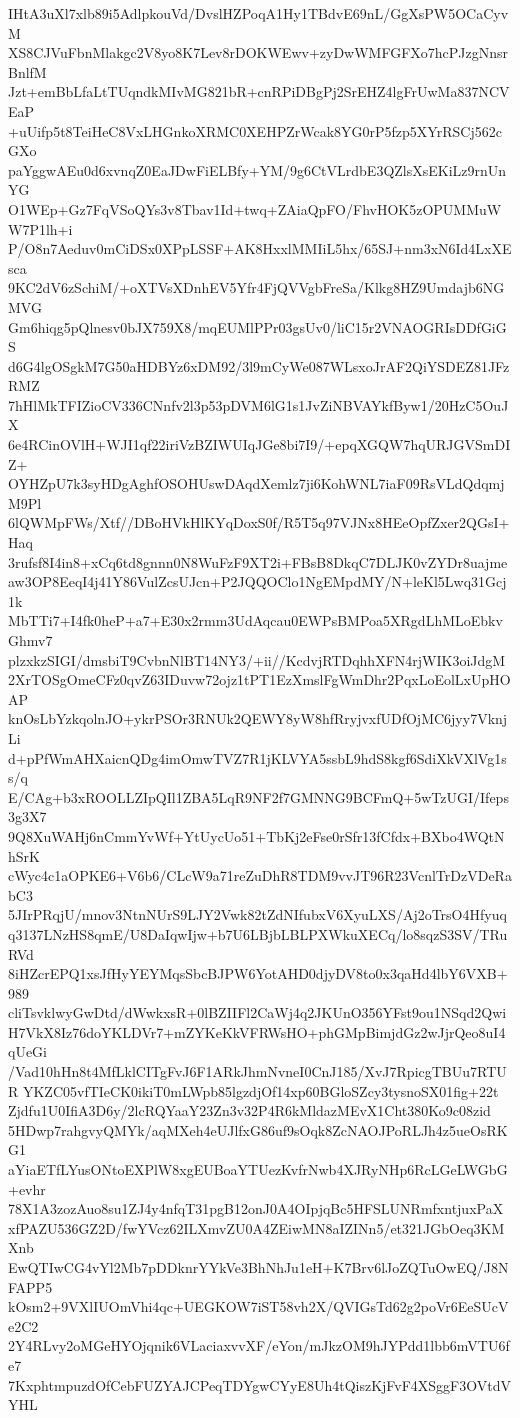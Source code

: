 IHtA3uXl7xlb89i5AdlpkouVd/DvslHZPoqA1Hy1TBdvE69nL/GgXsPW5OCaCyvM
XS8CJVuFbnMlakgc2V8yo8K7Lev8rDOKWEwv+zyDwWMFGFXo7hcPJzgNnsrBnlfM
Jzt+emBbLfaLtTUqndkMIvMG821bR+cnRPiDBgPj2SrEHZ4lgFrUwMa837NCVEaP
+uUifp5t8TeiHeC8VxLHGnkoXRMC0XEHPZrWcak8YG0rP5fzp5XYrRSCj562cGXo
paYggwAEu0d6xvnqZ0EaJDwFiELBfy+YM/9g6CtVLrdbE3QZlsXsEKiLz9rnUnYG
O1WEp+Gz7FqVSoQYs3v8Tbav1Id+twq+ZAiaQpFO/FhvHOK5zOPUMMuWW7P1lh+i
P/O8n7Aeduv0mCiDSx0XPpLSSF+AK8HxxlMMIiL5hx/65SJ+nm3xN6Id4LxXEsca
9KC2dV6zSchiM/+oXTVsXDnhEV5Yfr4FjQVVgbFreSa/Klkg8HZ9Umdajb6NGMVG
Gm6hiqg5pQlnesv0bJX759X8/mqEUMlPPr03gsUv0/liC15r2VNAOGRIsDDfGiGS
d6G4lgOSgkM7G50aHDBYz6xDM92/3l9mCyWe087WLsxoJrAF2QiYSDEZ81JFzRMZ
7hHlMkTFIZioCV336CNnfv2l3p53pDVM6lG1s1JvZiNBVAYkfByw1/20HzC5OuJX
6e4RCinOVlH+WJI1qf22iriVzBZIWUIqJGe8bi7I9/+epqXGQW7hqURJGVSmDIZ+
OYHZpU7k3syHDgAghfOSOHUswDAqdXemlz7ji6KohWNL7iaF09RsVLdQdqmjM9Pl
6lQWMpFWs/Xtf//DBoHVkHlKYqDoxS0f/R5T5q97VJNx8HEeOpfZxer2QGsI+Haq
3rufsf8I4in8+xCq6td8gnnn0N8WuFzF9XT2i+FBsB8DkqC7DLJK0vZYDr8uajme
aw3OP8EeqI4j41Y86VulZcsUJcn+P2JQQOClo1NgEMpdMY/N+leKl5Lwq31Gcj1k
MbTTi7+I4fk0heP+a7+E30x2rmm3UdAqcau0EWPsBMPoa5XRgdLhMLoEbkvGhmv7
plzxkzSIGI/dmsbiT9CvbnNlBT14NY3/+ii//KcdvjRTDqhhXFN4rjWIK3oiJdgM
2XrTOSgOmeCFz0qvZ63IDuvw72ojz1tPT1EzXmslFgWmDhr2PqxLoEolLxUpHOAP
knOsLbYzkqolnJO+ykrPSOr3RNUk2QEWY8yW8hfRryjvxfUDfOjMC6jyy7VknjLi
d+pPfWmAHXaicnQDg4imOmwTVZ7R1jKLVYA5ssbL9hdS8kgf6SdiXkVXlVg1ss/q
E/CAg+b3xROOLLZIpQIl1ZBA5LqR9NF2f7GMNNG9BCFmQ+5wTzUGI/Ifeps3g3X7
9Q8XuWAHj6nCmmYvWf+YtUycUo51+TbKj2eFse0rSfr13fCfdx+BXbo4WQtNhSrK
cWyc4c1aOPKE6+V6b6/CLcW9a71reZuDhR8TDM9vvJT96R23VcnlTrDzVDeRabC3
5JIrPRqjU/mnov3NtnNUrS9LJY2Vwk82tZdNIfubxV6XyuLXS/Aj2oTrsO4Hfyuq
q3137LNzHS8qmE/U8DaIqwIjw+b7U6LBjbLBLPXWkuXECq/lo8sqzS3SV/TRuRVd
8iHZcrEPQ1xsJfHyYEYMqsSbcBJPW6YotAHD0djyDV8to0x3qaHd4lbY6VXB+989
cliTsvklwyGwDtd/dWwkxsR+0lBZIIFl2CaWj4q2JKUnO356YFst9ou1NSqd2Qwi
H7VkX8Iz76doYKLDVr7+mZYKeKkVFRWsHO+phGMpBimjdGz2wJjrQeo8uI4qUeGi
/Vad10hHn8t4MfLklCITgFvJ6F1ARkJhmNvneI0CnJ185/XvJ7RpicgTBUu7RTUR
YKZC05vfTIeCK0ikiT0mLWpb85lgzdjOf14xp60BGloSZcy3tysnoSX01fig+22t
Zjdfu1U0IfiA3D6y/2lcRQYaaY23Zn3v32P4R6kMldazMEvX1Cht380Ko9c08zid
5HDwp7rahgvyQMYk/aqMXeh4eUJlfxG86uf9sOqk8ZcNAOJPoRLJh4z5ueOsRKG1
aYiaETfLYusONtoEXPlW8xgEUBoaYTUezKvfrNwb4XJRyNHp6RcLGeLWGbG+evhr
78X1A3zozAuo8su1ZJ4y4nfqT31pgB12onJ0A4OIpjqBc5HFSLUNRmfxntjuxPaX
xfPAZU536GZ2D/fwYVcz62ILXmvZU0A4ZEiwMN8aIZINn5/et321JGbOeq3KMXnb
EwQTIwCG4vYl2Mb7pDDknrYYkVe3BhNhJu1eH+K7Brv6lJoZQTuOwEQ/J8NFAPP5
kOsm2+9VXlIUOmVhi4qc+UEGKOW7iST58vh2X/QVIGsTd62g2poVr6EeSUcVe2C2
2Y4RLvy2oMGeHYOjqnik6VLaciaxvvXF/eYon/mJkzOM9hJYPdd1lbb6mVTU6fe7
7KxphtmpuzdOfCebFUZYAJCPeqTDYgwCYyE8Uh4tQiszKjFvF4XSggF3OVtdVYHL
